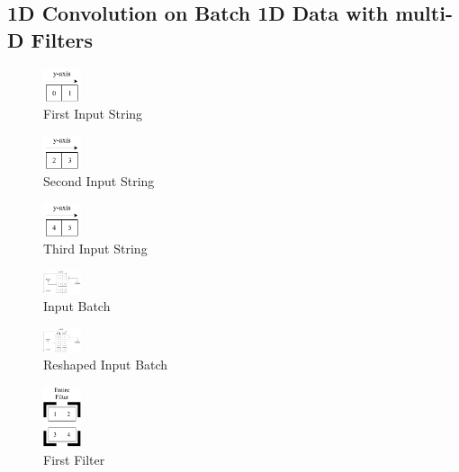 \documentclass[12pt]{article}
\begin{document}
\subsection{\textbf{1D Convolution on Batch 1D Data with multi-D Filters}}
	\begin{figure}[!htbp]
		\begin{center}
			\includegraphics[width=0.1\textwidth]{input1}
			\caption{First Input String}
		\end{center}
	\end{figure}	
\begin{figure}[!htbp]
\begin{center}
	\includegraphics[width=0.1\textwidth]{input2}
	\caption{Second Input String}
\end{center}
\end{figure}
\begin{figure}[!htbp]
\begin{center}
	\includegraphics[width=0.1\textwidth]{input3}
	\caption{Third Input String}
\end{center}
\end{figure}
\begin{figure}[!htbp]
\begin{center}
	\includegraphics[width=0.1\textwidth]{input_final}
	\caption{Input Batch}
\end{center}
\end{figure}
\begin{figure}[!htbp]
\begin{center}
	\includegraphics[width=0.1\textwidth]{input_reshaped}
	\caption{Reshaped Input Batch}
\end{center}
\end{figure}
\begin{figure}[!htbp]
\begin{center}
	\includegraphics[width=0.1\textwidth]{filter1}
	\caption{First Filter}
\end{center}
\end{figure}
\end{document}
